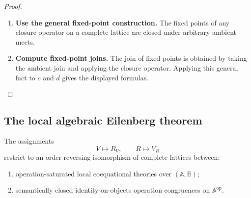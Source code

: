 \begin{proof}
    \leavevmode
    \begin{enumerate}
        \item \textbf{Use the general fixed-point construction.}
        The fixed points of any closure operator on a complete lattice are
        closed under arbitrary ambient meets.

        \item \textbf{Compute fixed-point joins.}
        The join of fixed points is obtained by taking the ambient join and
        applying the closure operator. Applying this general fact to \(c\) and
        \(d\) gives the displayed formulas.
    \end{enumerate}
\end{proof}

\subsection{The local algebraic Eilenberg theorem}
\label{subsec:to-local-eilenberg-theorem}

\begin{theorem}
\label{thm:to-local-algebraic-eilenberg}
    The assignments
    \[
        V\longmapsto R_V,
        \qquad
        R\longmapsto V_R
    \]
    restrict to an order-reversing isomorphism of complete lattices between:
    \begin{enumerate}
        \item operation-saturated local coequational theories over
        \((\mathbb A,\mathbb B)\);
        \item semantically closed identity-on-objects operation congruences on
        \(\mathbb A^{\mathrm{op}}\).
    \end{enumerate}
\end{theorem}

